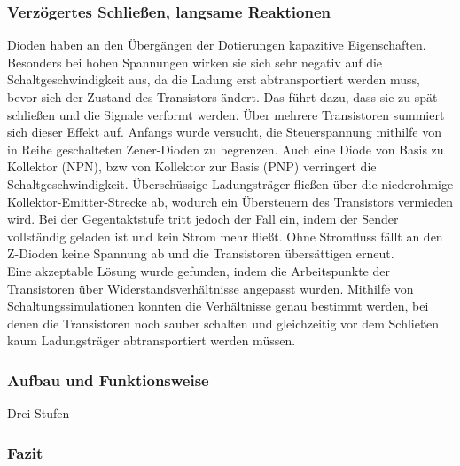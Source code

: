 \subsubsection{Verzögertes Schließen, langsame Reaktionen}
Dioden haben an den Übergängen der Dotierungen kapazitive Eigenschaften. Besonders bei hohen Spannungen wirken sie sich sehr negativ auf die Schaltgeschwindigkeit aus, da die Ladung erst abtransportiert werden muss, bevor sich der Zustand des Transistors ändert. Das führt dazu, dass sie zu spät schließen und die Signale verformt werden. Über mehrere Transistoren summiert sich dieser Effekt auf. Anfangs wurde versucht, die Steuerspannung mithilfe von in Reihe geschalteten Zener-Dioden zu begrenzen. Auch eine Diode von Basis zu Kollektor (NPN), bzw von Kollektor zur Basis (PNP) verringert die Schaltgeschwindigkeit. Überschüssige Ladungsträger fließen über die niederohmige Kollektor-Emitter-Strecke ab, wodurch ein Übersteuern des Transistors vermieden wird. Bei der Gegentaktstufe tritt jedoch der Fall ein, indem der Sender vollständig geladen ist und kein Strom mehr fließt. Ohne Stromfluss fällt an den Z-Dioden keine Spannung ab und die Transistoren übersättigen erneut.\\ %
Eine akzeptable Lösung wurde gefunden, indem die Arbeitspunkte der Transistoren über Widerstandsverhältnisse angepasst wurden. Mithilfe von Schaltungssimulationen konnten die Verhältnisse genau bestimmt werden, bei denen die Transistoren noch sauber schalten und gleichzeitig vor dem Schließen kaum Ladungsträger abtransportiert werden müssen.

\subsubsection{Aufbau und Funktionsweise}
Drei Stufen


\subsubsection{Fazit}




